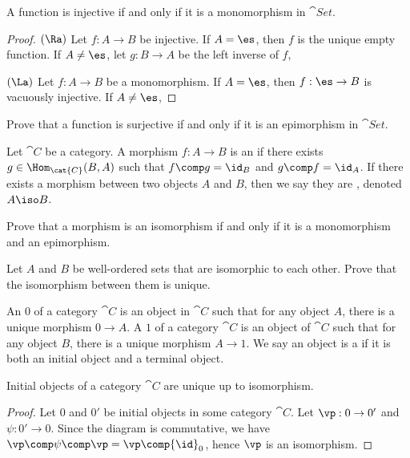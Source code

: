 \documentclass[10pt]{article}
\begin{document}
\begin{proposition}
    A function is injective if and only if it is a monomorphism in $\cat{Set}$.
\end{proposition}
\begin{proof}
    $(\Ra)$ Let $f:A\to B$ be injective. If $A=\es$, then $f$ is the unique empty function. If $A\ne\es$, let $g:B\to A$ be the left inverse of $f$, 


    $(\La)$ Let $f:A\to B$ be a monomorphism. If $A=\es$, then $f:\es\to B$ is vacuously injective. If $A\ne\es$, 
\end{proof}
\begin{problem}
    Prove that a function is surjective if and only if it is an epimorphism in $\cat{Set}$.
\end{problem}
\begin{definition}
    Let $\cat{C}$ be a category. A morphism $f:A\to B$ is an  if there exists $g\in{\Hom}_{\cat{C}}(B,A)$ such that $f\comp g={\id}_{B}$ and $g\comp f={\id}_{A}$. If there exists a morphism between two objects $A$ and $B$, then we say they are , denoted $A\iso B$.
\end{definition}
\begin{problem}
    Prove that a morphism is an isomorphism if and only if it is a monomorphism and an epimorphism.
\end{problem}
\begin{problem}
    Let $A$ and $B$ be well-ordered sets that are isomorphic to each other. Prove that the isomorphism between them is unique.
\end{problem}
\begin{definition}
    An  $0$ of a category $\cat{C}$ is an object in $\cat{C}$ such that for any object $A$, there is a unique morphism $0\to A$. A  $1$ of a category $\cat{C}$ is an object of $\cat{C}$ such that for any object $B$, there is a unique morphism $A\to 1$. We say an object is a  if it is both an initial object and a terminal object.
\end{definition}
\begin{proposition}
    Initial objects of a category $\cat{C}$ are unique up to isomorphism.
\end{proposition}
\begin{proof}
    Let $0$ and $0'$ be initial objects in some category $\cat{C}$. Let $\vp:0\to 0'$ and $\psi:0'\to 0$. Since the diagram is commutative, we have $\vp\comp\psi\comp\vp=\vp\comp{\id}_{0}$, hence $\vp$ is an isomorphism. 
\end{proof}
\end{document}
